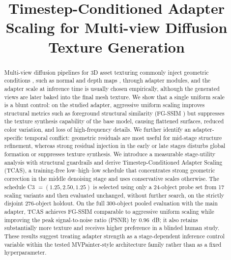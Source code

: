 \documentclass[times,twocolumn,final]{elsarticle}
\providecommand{\DIFadd}[1]{{\protect\color{blue} \sf #1}} %
\providecommand{\DIFaddbegin}{} %
\providecommand{\DIFaddend}{} %
\newcommand{\DIFaddincludegraphics}[2][]{{\color{blue}\fbox{\DIFOincludegraphics[#1]{#2}}}} %
\DeclareRobustCommand{\DIFaddbegin}{\DIFOaddbegin \let\includegraphics\DIFaddincludegraphics} %
\DeclareRobustCommand{\DIFaddend}{\DIFOaddend \let\includegraphics\DIFOincludegraphics} %
\begin{document}
\begin{frontmatter}

\title{\DIFaddbegin \DIFadd{Timestep-Conditioned }\DIFaddend Adapter Scaling   \DIFaddbegin \DIFadd{for }\DIFaddend Multi-view Diffusion Texture Generation}


\begin{abstract}
Multi-view diffusion   \DIFaddbegin \DIFadd{pipelines for }\DIFaddend 3D   \DIFaddbegin \DIFadd{asset texturing commonly }\DIFaddend inject geometric conditions  \DIFaddbegin \DIFadd{, such as normal }\DIFaddend and depth maps  \DIFaddbegin \DIFadd{, through adapter modules, and the adapter scale at inference time is usually chosen empirically, although the generated views are later baked into the final mesh texture. We show that a single uniform scale is a blunt control: on the studied adapter, aggressive uniform scaling improves }\DIFaddend structural metrics such as \DIFaddbegin \DIFadd{foreground structural similarity (}\DIFaddend FG-SSIM  \DIFaddbegin \DIFadd{) but suppresses }\DIFaddend the texture synthesis capability of the base   \DIFaddbegin \DIFadd{model, causing }\DIFaddend flattened surfaces, \DIFaddbegin \DIFadd{reduced color variation, }\DIFaddend and loss of high-frequency details.   \DIFaddbegin \DIFadd{We further }\DIFaddend identify an adapter-specific temporal conflict: geometric residuals   are most useful for mid-stage structure refinement, whereas   \DIFaddbegin \DIFadd{strong }\DIFaddend residual injection in \DIFaddbegin \DIFadd{the }\DIFaddend early or late stages   \DIFaddbegin \DIFadd{disturbs }\DIFaddend global formation or   \DIFaddbegin \DIFadd{suppresses }\DIFaddend texture synthesis.   \DIFaddbegin \DIFadd{We introduce a measurable stage-utility analysis with structural guardrails and derive }\DIFaddend Timestep-Conditioned Adapter Scaling (TCAS), a training-free   \DIFaddbegin \DIFadd{low--high--low schedule }\DIFaddend that concentrates strong geometric correction in the middle denoising stage and uses conservative scales   \DIFaddbegin \DIFadd{otherwise. The }\DIFaddend schedule C3   \DIFaddbegin \DIFadd{$=(1.25, 2.50, 1.25)$ is selected using only }\DIFaddend a 24-object probe set   \DIFaddbegin \DIFadd{from }\DIFaddend 17 scaling variants and   \DIFaddbegin \DIFadd{then evaluated unchanged, without further search, on the strictly disjoint 276-object holdout. On the full }\DIFaddend 300-object   \DIFaddbegin \DIFadd{pooled evaluation with the main adapter, TCAS achieves FG-SSIM comparable }\DIFaddend to aggressive uniform scaling while   \DIFaddbegin \DIFadd{improving the peak signal-to-noise ratio (PSNR) by 0.96~dB; it also retains substantially more texture and receives higher preference in a blinded human study}\DIFaddend . These results suggest   \DIFaddbegin \DIFadd{treating adapter strength }\DIFaddend as a stage-dependent inference control variable   \DIFaddbegin \DIFadd{within the tested MVPainter-style architecture family rather than as }\DIFaddend a fixed hyperparameter.
  \end{abstract}


\end{frontmatter}
\end{document}
